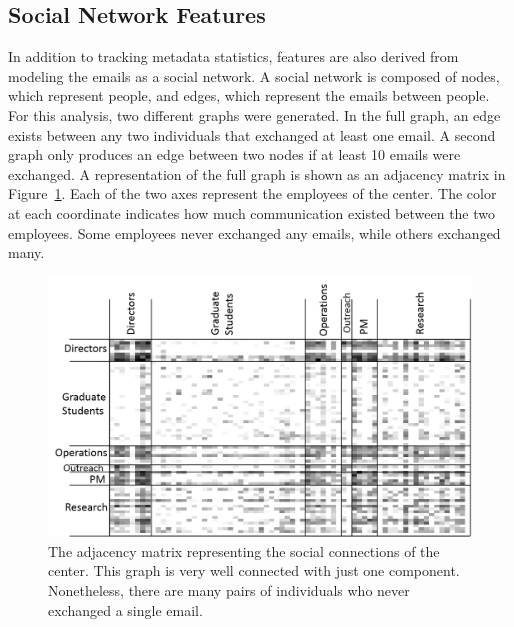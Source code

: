 \documentclass[12pt]{report}
\begin{document}
\subsection{Social Network Features}
In addition to tracking metadata statistics, features are also derived from modeling the emails as a social network.
A social network is composed of nodes, which represent people, and edges, which represent the emails between people.
For this analysis, two different graphs were generated.
In the full graph, an edge exists between any two individuals that exchanged at least one email.
A second graph only produces an edge between two nodes if at least 10 emails were exchanged.
A representation of the full graph is shown as an adjacency matrix in Figure~\ref{fig:adj_matrix}.
Each of the two axes represent the employees of the center.
The color at each coordinate indicates how much communication existed between the two employees.
Some employees never exchanged any emails, while others exchanged many.

\begin{figure}[t]
    \centering
    \includegraphics[width=\columnwidth,trim={4mm .5mm 0mm 5mm},clip]{adj_matrix}
    \vspace{-17pt}
    \caption[The dataset represented as an adjacency matrix]{The adjacency matrix representing the social connections of the center.  This graph is very well connected with just one component.  Nonetheless, there are many pairs of individuals who never exchanged a single email.}
    \label{fig:adj_matrix}
\end{figure}
\end{document}
